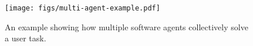 \begin{figure}[h]
    \centering
    \texttt{[image: figs/multi-agent-example.pdf]}
    \caption{An example showing how multiple software agents collectively solve a user task.}
    \label{fig:multi-agent}
\end{figure}